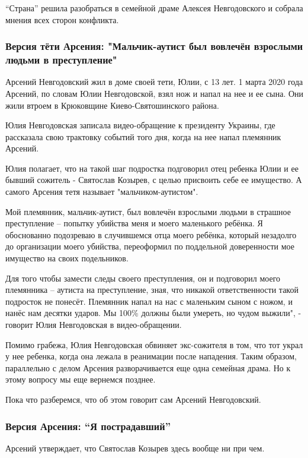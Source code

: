 “Страна” решила разобраться в семейной драме Алексея Невгодовского и собрала
мнения всех сторон конфликта.

\subsubsection{Версия тёти Арсения: "Мальчик-аутист был вовлечён взрослыми людьми в преступление"}

Арсений Невгодовский жил в доме своей тети, Юлии, с 13 лет. 1 марта 2020 года
Арсений, по словам Юлии Невгодовской, взял нож и напал на нее и ее сына. Они
жили втроем в Крюковщине Киево-Святошинского района.

Юлия Невгодовская записала видео-обращение к президенту Украины, где рассказала
свою трактовку событий того дня, когда на нее напал племянник Арсений. 

Юлия полагает, что на такой шаг подростка подговорил отец ребенка Юлии и ее
бывший сожитель - Святослав Козырев, с целью присвоить себе ее имущество. А
самого Арсения тетя называет "мальчиком-аутистом".

Мой племянник, мальчик-аутист, был вовлечён взрослыми людьми в страшное
преступление – попытку убийства меня и моего маленького ребёнка. Я обоснованно
подозреваю в случившемся отца моего ребёнка, который незадолго до организации
моего убийства, переоформил по поддельной доверенности мое имущество на своих
подельников.

Для того чтобы замести следы своего преступления, он и подговорил моего
племянника – аутиста  на преступление, зная, что никакой ответственности такой
подросток не понесёт. Племянник напал на нас с маленьким сыном с ножом, и нанёс
нам десятки ударов. Мы 100\% должны были умереть, но чудом выжили", - говорит
Юлия Невгодовская в видео-обращении. 

Помимо грабежа, Юлия Невгодовская обвиняет экс-сожителя в том, что тот украл у
нее ребенка, когда она лежала в реанимации после нападения. Таким образом,
параллельно с делом Арсения разворачивается еще одна семейная драма. Но к этому
вопросу мы еще вернемся позднее. 

Пока что разберемся, что об этом говорит сам Арсений Невгодовский. 

\subsubsection{Версия Арсения: “Я пострадавший”}

Арсений утверждает, что Святослав Козырев здесь вообще ни при чем.

